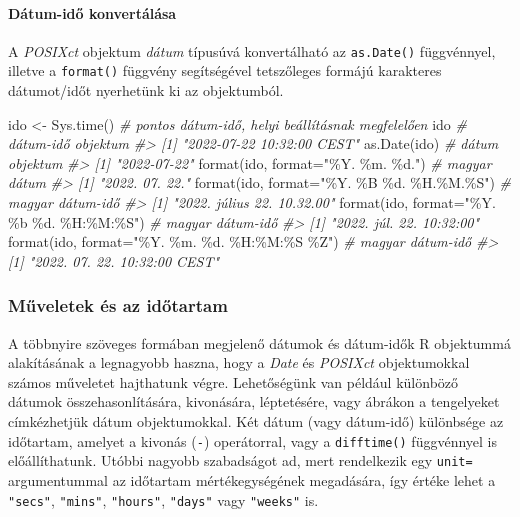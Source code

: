 \documentclass[
]{book}
\newenvironment{Shaded}{\begin{snugshade}}{\end{snugshade}}
\newcommand{\AttributeTok}[1]{\textcolor[rgb]{0.77,0.63,0.00}{#1}}
\newcommand{\CommentTok}[1]{\textcolor[rgb]{0.56,0.35,0.01}{\textit{#1}}}
\newcommand{\FunctionTok}[1]{\textcolor[rgb]{0.00,0.00,0.00}{#1}}
\newcommand{\NormalTok}[1]{#1}
\newcommand{\OtherTok}[1]{\textcolor[rgb]{0.56,0.35,0.01}{#1}}
\newcommand{\StringTok}[1]{\textcolor[rgb]{0.31,0.60,0.02}{#1}}
\begin{document}
\hypertarget{duxe1tum-idux151-konvertuxe1luxe1sa}{%
\paragraph{Dátum-idő konvertálása}\label{duxe1tum-idux151-konvertuxe1luxe1sa}}

A \emph{POSIXct} objektum \emph{dátum} típusúvá konvertálható az \texttt{as.Date()} függvénnyel, illetve a \texttt{format()} függvény segítségével tetszőleges formájú karakteres dátumot/időt nyerhetünk ki az objektumból.

\begin{Shaded}
\begin{Highlighting}[]
\NormalTok{ido }\OtherTok{\textless{}{-}} \FunctionTok{Sys.time}\NormalTok{()  }\CommentTok{\# pontos dátum{-}idő, helyi beállításnak megfelelően}
\NormalTok{ido                }\CommentTok{\# dátum{-}idő objektum}
\CommentTok{\#\textgreater{} [1] "2022{-}07{-}22 10:32:00 CEST"}
\FunctionTok{as.Date}\NormalTok{(ido)       }\CommentTok{\# dátum objektum}
\CommentTok{\#\textgreater{} [1] "2022{-}07{-}22"}
\FunctionTok{format}\NormalTok{(ido, }\AttributeTok{format=}\StringTok{"\%Y. \%m. \%d."}\NormalTok{)              }\CommentTok{\# magyar dátum}
\CommentTok{\#\textgreater{} [1] "2022. 07. 22."}
\FunctionTok{format}\NormalTok{(ido, }\AttributeTok{format=}\StringTok{"\%Y. \%B \%d. \%H.\%M.\%S"}\NormalTok{)      }\CommentTok{\# magyar dátum{-}idő}
\CommentTok{\#\textgreater{} [1] "2022. július 22. 10.32.00"}
\FunctionTok{format}\NormalTok{(ido, }\AttributeTok{format=}\StringTok{"\%Y. \%b \%d. \%H:\%M:\%S"}\NormalTok{)      }\CommentTok{\# magyar dátum{-}idő}
\CommentTok{\#\textgreater{} [1] "2022. júl. 22. 10:32:00"}
\FunctionTok{format}\NormalTok{(ido, }\AttributeTok{format=}\StringTok{"\%Y. \%m. \%d. \%H:\%M:\%S \%Z"}\NormalTok{)  }\CommentTok{\# magyar dátum{-}idő}
\CommentTok{\#\textgreater{} [1] "2022. 07. 22. 10:32:00 CEST"}
\end{Highlighting}
\end{Shaded}

\hypertarget{mux171veletek-uxe9s-az-idux151tartam}{%
\subsubsection{Műveletek és az időtartam}\label{mux171veletek-uxe9s-az-idux151tartam}}

A többnyire szöveges formában megjelenő dátumok és dátum-idők R objektummá alakításának a legnagyobb haszna, hogy a \emph{Date} és \emph{POSIXct} objektumokkal számos műveletet hajthatunk végre. Lehetőségünk van például különböző dátumok összehasonlítására, kivonására, léptetésére, vagy ábrákon a tengelyeket címkézhetjük dátum objektumokkal. Két dátum (vagy dátum-idő) különbsége az időtartam, amelyet a kivonás (\texttt{-}) operátorral, vagy a \texttt{difftime()} függvénnyel is előállíthatunk. Utóbbi nagyobb szabadságot ad, mert rendelkezik egy \texttt{unit=} argumentummal az időtartam mértékegységének megadására, így értéke lehet a \texttt{"secs"}, \texttt{"mins"}, \texttt{"hours"}, \texttt{"days"} vagy \texttt{"weeks"} is.
\end{document}
